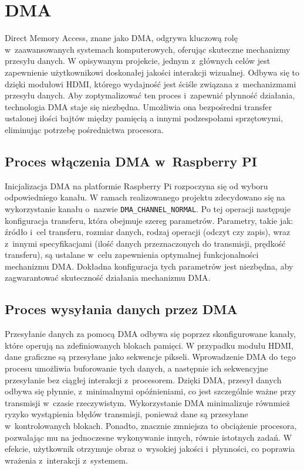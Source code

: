\documentclass[shortabstract]{iithesis}
\begin{document}
\section{DMA}
Direct Memory Access, znane jako DMA, odgrywa kluczową rolę w~zaawansowanych systemach komputerowych, oferując skuteczne mechanizmy przesyłu danych. W opisywanym projekcie, jednym z~głównych celów jest zapewnienie użytkownikowi doskonałej jakości interakcji wizualnej. Odbywa się to dzięki modułowi HDMI, którego wydajność jest ściśle związana z~mechanizmami przesyłu danych. Aby zoptymalizować ten proces i~zapewnić płynność działania, technologia DMA staje się niezbędna. Umożliwia ona bezpośredni transfer ustalonej ilości bajtów między pamięcią a innymi podzespołami sprzętowymi, eliminując potrzebę pośrednictwa procesora.
\subsection{Proces włączenia DMA w~Raspberry PI}
Inicjalizacja DMA na platformie Raspberry Pi rozpoczyna się od wyboru odpowiedniego kanału. W ramach realizowanego projektu zdecydowano się na wykorzystanie kanału o~nazwie \texttt{DMA\_CHANNEL\_NORMAL}. Po tej operacji następuje konfiguracja transferu, która obejmuje szereg parametrów. Parametry, takie jak: źródło i~cel transferu, rozmiar danych, rodzaj operacji (odczyt czy zapis), wraz z~innymi specyfikacjami (ilość danych przeznaczonych do transmisji, prędkość transferu), są ustalane w~celu zapewnienia optymalnej funkcjonalności mechanizmu DMA. Dokładna konfiguracja tych parametrów jest niezbędna, aby zagwarantować skuteczność działania mechanizmu DMA.
\subsection{Proces wysyłania danych przez DMA}
Przesyłanie danych za pomocą DMA odbywa się poprzez skonfigurowane kanały, które operują na zdefiniowanych blokach pamięci. W przypadku modułu HDMI, dane graficzne są przesyłane jako sekwencje pikseli. Wprowadzenie DMA do tego procesu umożliwia buforowanie tych danych, a następnie ich sekwencyjne przesyłanie bez ciągłej interakcji z~procesorem. Dzięki DMA, przesył danych odbywa się płynnie, z~minimalnymi opóźnieniami, co jest szczególnie ważne przy transmisji w~czasie rzeczywistym. Wykorzystanie DMA minimalizuje równmież ryzyko wystąpienia błędów transmisji, ponieważ dane są przesyłane w~kontrolowanych blokach. Ponadto, znacznie zmniejsza to obciążenie procesora, pozwalając mu na jednoczesne wykonywanie innych, równie istotnych zadań. W efekcie, użytkownik otrzymuje obraz o~wysokiej jakości i~płynności, co poprawia wrażenia z~interakcji z~systemem.
\end{document}
